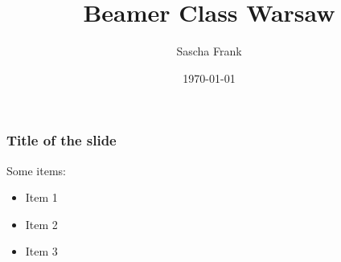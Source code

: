 \documentclass{beamer}
\begin{document}
\title{Beamer Class Warsaw}
\author{Sascha Frank}
\date{\today}

\begin{frame}\frametitle{Title of the slide}
    Some items:
    \begin{itemize}
    \item Item 1
    \item Item 2
    \item Item 3
    \end{itemize}
\end{frame}
\end{document}
